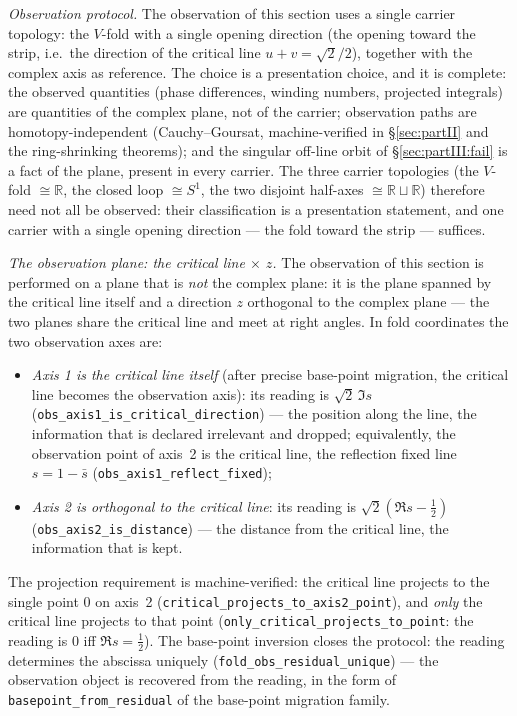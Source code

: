 \documentclass{article}
\begin{document}
\emph{Observation protocol.} The observation of this section uses a
single carrier topology: the $V$-fold with a single opening direction
(the opening toward the strip, i.e.\ the direction of the critical line
$u+v=\sqrt2/2$), together with the complex axis as reference. The
choice is a presentation choice, and it is complete: the observed
quantities (phase differences, winding numbers, projected integrals)
are quantities of the complex plane, not of the carrier; observation
paths are homotopy-independent (Cauchy--Goursat, machine-verified in
\S\ref{sec:partII} and the ring-shrinking theorems); and the singular off-line orbit
of \S\ref{sec:partIII:fail} is a fact of the plane, present in every
carrier. The three carrier topologies (the $V$-fold $\cong\mathbb R$,
the closed loop $\cong S^1$, the two disjoint half-axes $\cong
\mathbb R\sqcup\mathbb R$) therefore need not all be observed: their
classification is a presentation statement, and one carrier with a
single opening direction --- the fold toward the strip --- suffices.

\emph{The observation plane: the critical line $\times$ $z$.}
The observation of this section is performed on a plane that is
\emph{not} the complex plane: it is the plane spanned by the critical
line itself and a direction $z$ orthogonal to the complex plane --- the
two planes share the critical line and meet at right angles. In fold
coordinates the two observation axes are:
\begin{itemize}
\item \emph{Axis 1 is the critical line itself} (after precise
  base-point migration, the critical line becomes the observation
  axis): its reading is $\sqrt2\,\Im s$
  (\texttt{obs\_axis1\_is\_critical\_direction}) --- the position along
  the line, the information that is declared irrelevant and dropped;
  equivalently, the observation point of axis~2 is the critical line,
  the reflection fixed line $s=1-\bar s$
  (\texttt{obs\_axis1\_reflect\_fixed});
\item \emph{Axis 2 is orthogonal to the critical line}: its reading is
  $\sqrt2(\Re s-\tfrac12)$
  (\texttt{obs\_axis2\_is\_distance}) --- the distance from the critical
  line, the information that is kept.
\end{itemize}
The projection requirement is machine-verified: the critical line
projects to the single point $0$ on axis~2
(\texttt{critical\_projects\_to\_axis2\_point}), and \emph{only} the
critical line projects to that point
(\texttt{only\_critical\_projects\_to\_point}: the reading is $0$ iff
$\Re s=\tfrac12$). The base-point inversion closes the protocol: the
reading determines the abscissa uniquely
(\texttt{fold\_obs\_residual\_unique}) --- the observation object is
recovered from the reading, in the form of
\texttt{basepoint\_from\_residual} of the base-point migration family.
\end{document}
